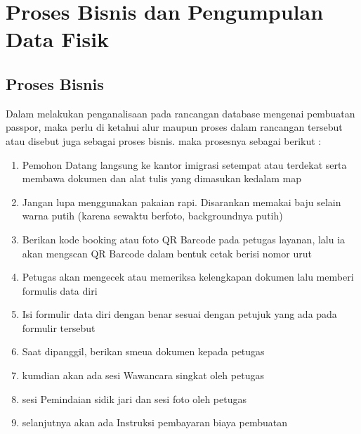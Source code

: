 \chapter{Proses Bisnis dan Pengumpulan Data Fisik}

\section{Proses Bisnis}
Dalam melakukan penganalisaan pada rancangan database mengenai pembuatan passpor, maka perlu di ketahui alur maupun proses dalam rancangan tersebut atau disebut juga sebagai proses bisnis. maka prosesnya sebagai berikut :
\begin{enumerate}
	\item Pemohon Datang langsung ke kantor imigrasi setempat atau terdekat serta membawa dokumen dan alat tulis yang dimasukan kedalam map
	\item Jangan lupa menggunakan pakaian rapi. Disarankan memakai baju selain warna putih (karena sewaktu berfoto, backgroundnya putih)
	\item Berikan kode booking atau foto QR Barcode pada petugas layanan, lalu ia akan mengscan QR Barcode dalam bentuk cetak berisi nomor urut
	\item Petugas akan mengecek atau memeriksa kelengkapan dokumen lalu memberi formulis data diri
    \item Isi formulir data diri dengan benar sesuai dengan petujuk yang ada pada formulir tersebut
    \item Saat dipanggil, berikan smeua dokumen kepada petugas
    \item kumdian akan ada sesi Wawancara singkat oleh petugas
    \item sesi Pemindaian sidik jari dan sesi foto oleh petugas
    \item selanjutnya akan ada Instruksi pembayaran biaya pembuatan
\end{enumerate}
